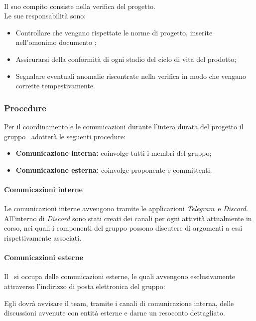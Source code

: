       \paragraph{\roleVerifier}
        Il suo compito consiste nella verifica del progetto.\\
        Le sue responsabilità sono:
        \begin{itemize}
          \item Controllare che vengano rispettate le norme di progetto, inserite nell'omonimo documento \docNameVersionNdP;
          \item Assicurarsi della conformità di ogni stadio del ciclo di vita del prodotto;
          \item Segnalare eventuali anomalie riscontrate nella verifica in modo che vengano corrette tempestivamente.
        \end{itemize}
  \subsubsection {Procedure}
  Per il coordinamento e le comunicazioni durante l'intera durata del progetto il gruppo \groupName\ adotterà le seguenti procedure:
  \begin{itemize}
    \item \textbf{Comunicazione interna:} coinvolge tutti i membri del gruppo;
    \item  \textbf{Comunicazione esterna:} coinvolge proponente e committenti.
  \end{itemize}
  \paragraph{Comunicazioni interne}
  Le comunicazioni interne avvengono tramite le applicazioni \textit{Telegram}\glo\ e \textit{Discord}\glo. All'interno di \textit{Discord} sono stati creati dei canali per ogni attività attualmente in corso, nei quali i componenti del gruppo possono discutere di argomenti a essi rispettivamente associati.
  \paragraph{Comunicazioni esterne}
  Il \roleProjectManagerLow\ si occupa delle comunicazioni esterne, le quali avvengono esclusivamente attraverso l'indirizzo di posta elettronica del gruppo:\\
  \begin{center}
    \groupEmail
  \end{center}
  Egli dovrà avvisare il team, tramite i canali di comunicazione interna, delle discussioni avvenute con entità esterne e darne un resoconto dettagliato.
